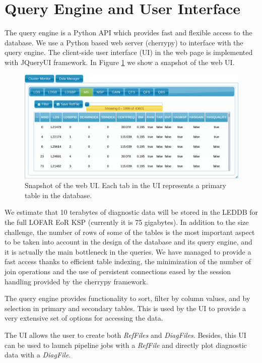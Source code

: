 \section{Query Engine and User Interface}

The query engine is a Python API which provides fast and flexible access to the database. We use a Python based web server (cherrypy) to interface with the query engine. The client-side user interface (UI) in the web page is implemented with JQueryUI framework. In Figure \ref{fig:webui} we show a snapshot of the web UI.
\begin{figure}[!ht]
  \centering
    \includegraphics[scale=0.24]{part10/Martinez-rubi_O23/O23_f3.eps} 
  \caption{Snapshot of the web UI. Each tab in the UI represents a primary table in the database.}
  \label{fig:webui}
\end{figure}

We estimate that 10 terabytes of diagnostic data will be stored in the LEDDB for the full LOFAR EoR KSP (currently it is 75 gigabytes). In addition to the size challenge, the number of rows of some of the tables is the most important aspect to be taken into account in the design of the database and its query engine, and it is actually the main bottleneck in the queries. We have managed to provide a fast access thanks to efficient table indexing, the minimization of the number of join operations and the use of persistent connections eased by the session handling provided by the cherrypy framework. 

The query engine provides functionality to sort, filter by column values, and by selection in primary and secondary tables. This is used by the UI to provide a very extensive set of options for accessing the data.

The UI allows the user to create both \textit{RefFiles} and \textit{DiagFiles}. Besides, this UI can be used to launch pipeline jobs with a \textit{RefFile} and directly plot diagnostic data with a \textit{DiagFile}.

